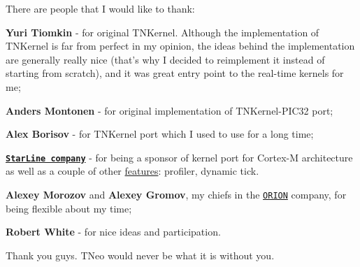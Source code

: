 There are people that I would like to thank\+:


\begin{DoxyItemize}
\item {\bfseries Yuri Tiomkin} -\/ for original T\+N\+Kernel. Although the implementation of T\+N\+Kernel is far from perfect in my opinion, the ideas behind the implementation are generally really nice (that's why I decided to reimplement it instead of starting from scratch), and it was great entry point to the real-\/time kernels for me;
\item {\bfseries Anders Montonen} -\/ for original implementation of T\+N\+Kernel-\/\+P\+I\+C32 port;
\item {\bfseries Alex Borisov} -\/ for T\+N\+Kernel port which I used to use for a long time;
\item \href{http://starline.ru}{\tt {\bfseries Star\+Line company}} -\/ for being a sponsor of kernel port for Cortex-\/\+M architecture as well as a couple of other \hyperlink{features}{features}\+: profiler, dynamic tick.
\item {\bfseries Alexey Morozov} and {\bfseries Alexey Gromov}, my chiefs in the \href{http://orionspb.ru/}{\tt O\+R\+I\+O\+N} company, for being flexible about my time;
\item {\bfseries Robert White} -\/ for nice ideas and participation.
\end{DoxyItemize}

Thank you guys. T\+Neo would never be what it is without you. 